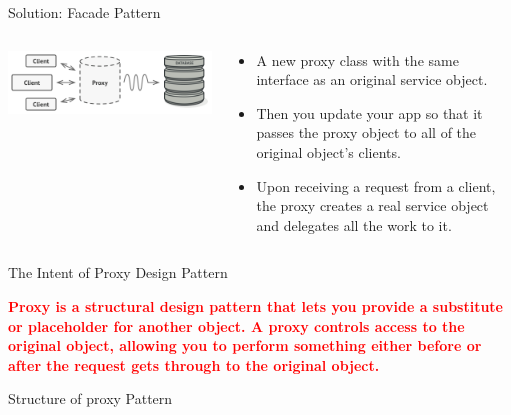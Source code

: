 \documentclass[13pt]{beamer}
\begin{document}
\begin{frame}{Solution: Facade Pattern}
	\begin{columns}[T]
		\begin{column}{.5\textwidth}
			\includegraphics[scale=0.3]{./images/solution.png}
		\end{column}
	
		\begin{column}{.5\textwidth}
			\begin{itemize}
				\item A new proxy class with the same interface as an original service object.
				\item Then you update your app so that it passes the proxy object to all of the original object’s clients.
				\item Upon receiving a request from a client, the proxy creates a real service object and delegates all the work to it.
			\end{itemize}
		\end{column}
	\end{columns}
\end{frame}

\begin{frame}{The Intent of Proxy Design Pattern}
	\begin{center}
	\textcolor{red}{\textbf{Proxy is a structural design pattern that lets you provide a substitute or placeholder for another object. A proxy controls access to the original object, allowing you to perform something either before or after the request gets through to the original object.}}\\
	\end{center}
\end{frame}

\begin{frame}{Structure of proxy Pattern}
	\begin{center}
	\end{center}
\end{frame}
\end{document}
